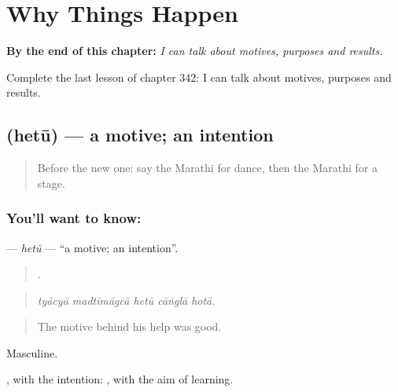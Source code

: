 
\chapter{Why Things Happen}
\label{ch:mr-why-things-happen}

\begin{chapteropening}
\textbf{By the end of this chapter:} \emph{I can talk about motives, purposes and results.}

Complete the last lesson of chapter 342: I can talk about motives, purposes and results.
\end{chapteropening}

\section[\texorpdfstring{\mr{हेतू} (hetū)}{हेतू (hetū)}]{ (hetū) — a motive; an intention}

\label{lesson:MR-C342-hetu}



\begin{quote}
Before the new one: say the Marathi for dance, then the Marathi for a stage.
\end{quote}

\subsection*{You'll want to know: }
\textbf{} — \emph{hetū} — \textquotedblleft{}a motive; an intention\textquotedblright{}.

\begin{quote}
    .
\end{quote}

\begin{quote}
\emph{tyācyā madtīmāgcā hetū cāṅglā hotā.}
\end{quote}

\begin{quote}
The motive behind his help was good.
\end{quote}

Masculine.

, with the intention:  , with the aim of learning.

